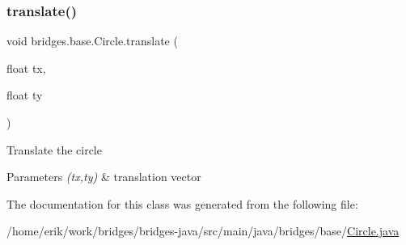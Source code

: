 \subsubsection{\texorpdfstring{translate()}{translate()}}
{\footnotesize\ttfamily void bridges.\+base.\+Circle.\+translate (\begin{DoxyParamCaption}\item[{float}]{tx,  }\item[{float}]{ty }\end{DoxyParamCaption})}

Translate the circle


\begin{DoxyParams}{Parameters}
{\em (tx,ty)} & translation vector \\
\hline
\end{DoxyParams}


The documentation for this class was generated from the following file\+:\begin{DoxyCompactItemize}
\item 
/home/erik/work/bridges/bridges-\/java/src/main/java/bridges/base/\hyperlink{_circle_8java}{Circle.\+java}\end{DoxyCompactItemize}
